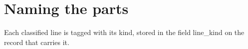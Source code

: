 \section{Naming the parts}

Each classified line is tagged with its kind, stored in the field line_kind on the
record that carries it.
